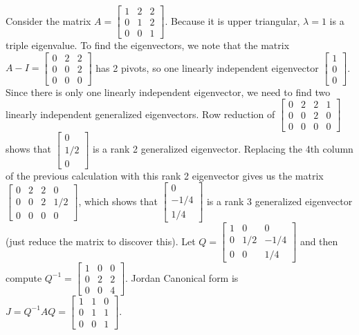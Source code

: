 \begin{example}
Consider the matrix 
$ A=\begin{bmatrix} 
1&2&2\\
0&1&2\\
0&0&1
\end{bmatrix} 
$.  Because it is upper triangular, $\lambda = 1$ is a triple eigenvalue. To find the eigenvectors, we note that the matrix 
$A-I= \begin{bmatrix} 
0&2&2\\
0&0&2\\
0&0&0
\end{bmatrix} 
$
has 2 pivots, so one linearly independent eigenvector 
$\begin{bmatrix} 
1\\
0\\
0
\end{bmatrix}$. 
Since there is only one linearly independent eigenvector, we need to find two linearly independent generalized eigenvectors. Row reduction of $\begin{bmatrix} 
0&2&2&1\\
0&0&2&0\\
0&0&0&0
\end{bmatrix}$ 
shows that  
$\begin{bmatrix} 
0\\
1/2\\
0
\end{bmatrix}$ is a rank 2 generalized eigenvector. Replacing the 4th column of the previous calculation with this rank 2 eigenvector gives us the matrix 
$\begin{bmatrix} 
0&2&2&0\\
0&0&2&1/2\\
0&0&0&0
\end{bmatrix}$, which shows that $\begin{bmatrix} 
0\\
-1/4\\
1/4
\end{bmatrix}$ is a rank 3 generalized eigenvector (just reduce the matrix to discover this).
Let $Q=\begin{bmatrix} 
1&0&0\\
0&1/2&-1/4\\
0&0&1/4
\end{bmatrix} 
$ and then compute $Q^{-1} = \begin{bmatrix} 
1&0&0\\
0&2&2\\
0&0&4
\end{bmatrix} 
$. 
Jordan Canonical form is $J=Q^{-1}AQ=\begin{bmatrix} 
1&1&0\\
0&1&1\\
0&0&1
\end{bmatrix} 
$. 



\end{example}












